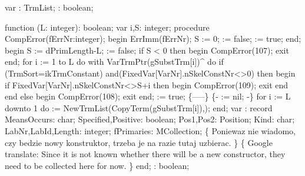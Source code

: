 var : TrmList;
    : boolean;

function (L: integer): boolean;
var
   i,S: integer;
   procedure CompError(fErrNr:integer);
   begin
      ErrImm(fErrNr);
      S := 0;
       := false;
       := true;
   end;
begin
   S := dPrimLength-L;
    := false;
   if S < 0 then begin CompError(107); exit end;
   for i := 1 to L do
      with VarTrmPtr(gSubstTrm[i])^ do
         if (TrmSort=ikTrmConstant) and(FixedVar[VarNr].nSkelConstNr<>0) then
         begin
            if FixedVar[VarNr].nSkelConstNr<>S+i then begin CompError(109); exit end
         end
         else begin CompError(108); exit end;
    := true;
   \{-----\}
   \{-  := nil; -\}
   for i := L downto 1 do
       := NewTrmList(CopyTerm(gSubstTrm[i]),);
end;
\eatline
{}\nwendcode{}\nwdocspar
\nwenddocs{}\endmoddef\nwstartdeflinemarkup\nwenddeflinemarkup
var
   :
      record
         MeansOccurs: char;
         Specified,Positive: boolean;
         Pos1,Pos2: Position;
         Kind: char;
         LabNr,LabId,Length: integer;
         fPrimaries: MCollection;
         \{ Poniewaz nie wiadomo, czy bedzie nowy konstruktor,
           trzeba je na razie tutaj uzbierac.
         \}
         \{ Google translate:
           Since it is not known whether there will be a new constructor,
           they need to be collected here for now. \}
      end;
   : boolean;

